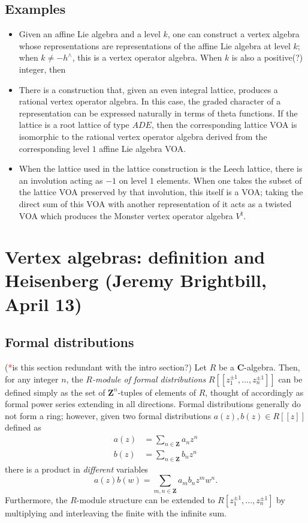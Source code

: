 \documentclass{article}
\newcommand{\CC}{\mathbold{C}}
\newcommand{\ZZ}{\mathbold{Z}}
\newcommand{\tk}{\textcolor{red}{*}}
\begin{document}
\subsection{Examples}
\begin{itemize}
\item Given an affine Lie algebra and a level $k$, one can construct a vertex algebra whose representations are representations of the affine Lie algebra at level $k$; when $k \ne - h^\wedge$, this is a vertex operator algebra.  When $k$ is also a positive(?) integer, then 
\item There is a construction that, given an even integral lattice, produces a rational vertex operator algebra.  In this case, the graded character of a representation can be expressed naturally in terms of theta functions.  If the lattice is a root lattice of type $ADE$, then the corresponding lattice VOA is isomorphic to the rational vertex operator algebra derived from the corresponding level $1$ affine Lie algebra VOA.
\item When the lattice used in the lattice construction is the Leech lattice, there is an involution acting as $-1$ on level $1$ elements.  When one takes the subset of the lattice VOA preserved by that involution, this itself is a VOA; taking the direct sum of this VOA with another representation of it acts as a twisted VOA which produces the Monster vertex operator algebra $V^\natural$.
\end{itemize}

\section{Vertex algebras: definition and Heisenberg (Jeremy Brightbill, April 13)}
\label{sec:defheis}

\subsection{Formal distributions}
(\tk is this section redundant with the intro section?)
Let $R$ be a $\CC$-algebra.  Then, for any integer $n$, the \textit{$R$-module of formal distributions} $R[[z_1^{\pm 1},...,z_n^{\pm 1}]]$ can be defined simply as the set of $\ZZ^n$-tuples of elements of $R$, thought of accordingly as formal power series extending in all directions.  Formal distributions generally do not form a ring; however, given two formal distributions $a(z),b(z) \in R[[z]]$ defined as
\begin{align*}
  a(z)&=\sum_{n \in \ZZ}a_nz^n\\
  b(z)&=\sum_{n \in \ZZ}b_nz^n
\end{align*}
there is a product in \textit{different} variables
\[a(z)b(w) = \sum_{m,n \in \ZZ}a_mb_nz^mw^n. \]
Furthermore, the $R$-module structure can be extended to $R[z_1^{\pm 1},...,z_n^{\pm 1}]$ by multiplying and interleaving the finite with the infinite sum.
\end{document}
